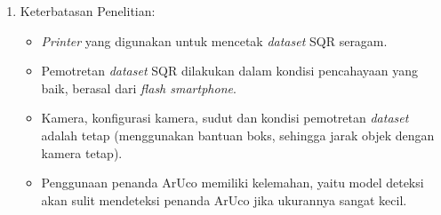 \begin{enumerate}
\begin{itemize}
            \end{itemize}
      \item Keterbatasan Penelitian:
            \begin{itemize}
                  \item \emph{Printer} yang digunakan untuk mencetak \emph{dataset} SQR seragam.
                  \item Pemotretan \emph{dataset} SQR dilakukan dalam kondisi pencahayaan yang baik, berasal dari \emph{flash smartphone}.
                  \item Kamera, konfigurasi kamera, sudut dan kondisi pemotretan \emph{dataset} adalah tetap (menggunakan bantuan boks, sehingga jarak objek dengan kamera tetap).
                  \item Penggunaan penanda ArUco memiliki kelemahan, yaitu model deteksi akan sulit mendeteksi penanda ArUco jika ukurannya sangat kecil.
            \end{itemize}
\end{enumerate}

